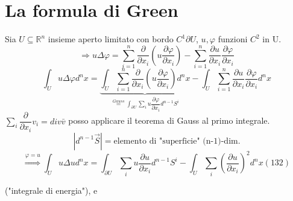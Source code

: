 \documentclass[a4paper,11pt]{report}
\newcommand{\Rn}{\mathbb{R}^n}
\begin{document}
\section{La formula di Green}
Sia $U\subseteq \Rn$ insieme aperto limitato con bordo $C^1 \partial U$, $u,\varphi$ funzioni $C^2$ in U.
$$
\Rightarrow u\Delta \varphi = \sum_{i=1}^n\dfrac{\partial}{\partial x_i}\left(u\dfrac{\partial \varphi}{\partial x_i} \right) - \sum_{i=1}^{n}\dfrac{\partial u}{\partial x_i}\dfrac{\partial \varphi}{\partial x_i}
$$
$$
\int_{U}u\Delta \varphi d^nx=\underset{\overset{Gauss}{=}\int_{\partial U}\sum_i u\dfrac{\partial \varphi}{\partial x_i}d^{n-1}S^i}{\underbrace{\int_{U}\sum_{i=1}^n\dfrac{\partial}{\partial x_i}\left(u\dfrac{\partial \varphi}{\partial x_i} \right)d^nx}} - \int_{U} \sum_{i=1}^{n} \dfrac{\partial u}{\partial x_i}\dfrac{\partial \varphi}{\partial x_i}d^nx
$$
$\sum_i \dfrac{\partial }{\partial x_i}v_i = div \bar{v}$ posso applicare il teorema di Gauss al primo integrale.
$$
\left| d^{n-1}\vec{S}\right| = \text{elemento di "superficie" (n-1)-dim.}
$$
\begin{equation}
\overset{\varphi=u}{\Rightarrow} \int_U u\Delta u d^n x = \int_{\partial U} \sum_i u\dfrac{\partial u}{\partial x_i}d^{n-1}S^i - \int_{U}\sum_i \left(\dfrac{\partial u}{\partial x_i}\right)^2 d^n x (132)
\end{equation}

("integrale di energia"), e 
\end{document}
